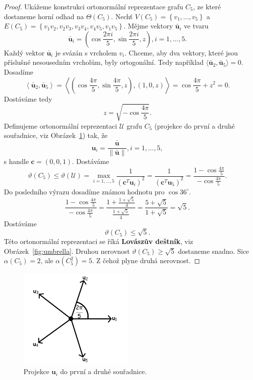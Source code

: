 \begin{proof}
    Ukážeme konstrukci ortonormální reprezentace grafu $C_5$, ze které dostaneme horní odhad na $\Theta(C_5)$. Nechť $V(C_5) = \left\{ v_1, \dots, v_5 \right\}$ a $E(C_5) = \left\{ v_1v_2, v_2v_3, v_3v_4, v_4v_5, v_1v_5 \right\}$. Mějme vektory $\bar{\mathbf{u}}_i$ ve tvaru
    $$
        \bar{\mathbf{u}}_i = \left( \cos\frac{2 \pi i}{5}, \sin \frac{2 \pi i}{5}, z \right), i = 1, \dots, 5.
    $$
    Každý vektor $\bar{\mathbf{u}}_i$ je svázán s vrcholem $v_i$. Chceme, aby dva vektory, které jsou příslušné nesousedním vrcholům, byly ortogonální. Tedy například $\langle \bar{\mathbf{u}}_2, \bar{\mathbf{u}}_5 \rangle = 0$. Dosadíme
    $$
        \left\langle \bar{\mathbf{u}}_2, \bar{\mathbf{u}}_5 \right\rangle = 
        \left\langle ( \cos\frac{4\pi}{5}, \sin\frac{4\pi}{5}, z ), \left( 1, 0, z \right) \right\rangle =
        \cos\frac{4\pi}{5} + z^2 = 0.
    $$
    Dostáváme tedy
    $$
        z = \sqrt{-\cos\frac{4\pi}{5}}.
    $$
    Definujeme ortonormální reprezentaci $\mathcal{U}$ grafu $C_5$ (projekce do první a druhé souřadnice, viz Obrázek~\ref{fig:umbrella_projection}) tak, že
    $$
        \mathbf{u}_i = \frac{\bar{\mathbf{u}}}{\| \bar{\mathbf{u}} \|}, i = 1, \dots, 5,
    $$
    s handle $\mathbf{c} = \left( 0, 0, 1 \right)$.
    Dostáváme
    $$
        \vartheta(C_5) \leq \vartheta(\mathcal{U}) = \max_{i = 1, \dots, 5} \frac{1}{(\mathbf{c}^T\mathbf{u}_i)^2} = \frac{1}{(\mathbf{c}^T\mathbf{u}_5)^2} = \frac{1 - \cos\frac{4\pi}{5}}{-\cos\frac{4\pi}{5}}.
    $$
    Do posledního výrazu dosadíme známou hodnotu pro $\cos 36^{\circ}$.
    $$
        \frac{1 - \cos\frac{4\pi}{5}}{-\cos\frac{4\pi}{5}} = \frac{1 + \frac{1 + \sqrt{5}}{4}}{\frac{1 + \sqrt{5}}{4}} = \frac{5 + \sqrt{5}}{1 + \sqrt{5}} = \sqrt{5}.
    $$
    Dostáváme
    $$
        \vartheta(C_5) \leq \sqrt{5}.
    $$
    Této ortonormální reprezentaci se říká \textbf{Lovászův deštník}, viz Obrázek~\ref{fig:umbrella}. Druhou nerovnost $\vartheta(C_5) \geq \sqrt{5}$ dostaneme snadno. Sice $\alpha(C_5) = 2$, ale $\alpha(C_5^2) = 5$. Z čehož plyne druhá nerovnost.
\end{proof}

\begin{figure}[h!]
    \centering
    \includegraphics[width=0.5\textwidth]{img/umbrella_projection.png} 
    \caption{Projekce $\mathbf{u}_i$ do první a druhé souřadnice.}
    \label{fig:umbrella_projection}
\end{figure}

